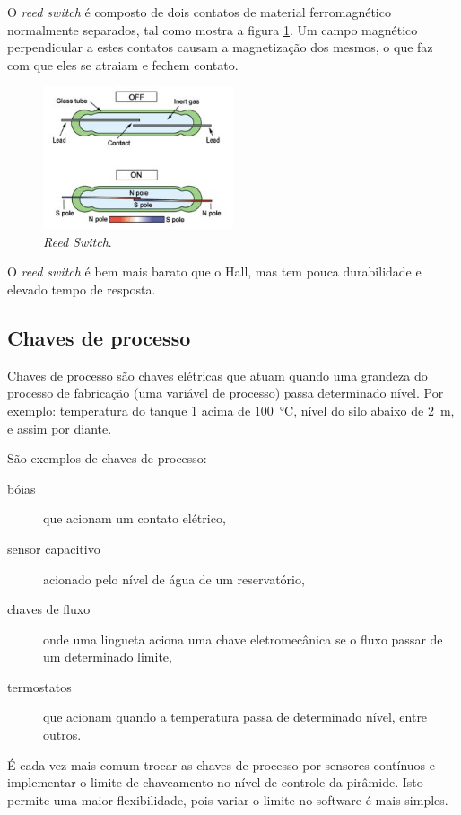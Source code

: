 O \emph{reed switch} é composto de dois contatos de material ferromagnético normalmente separados, tal como mostra a figura \ref{fig:reed}. Um campo magnético perpendicular a estes contatos causam a magnetização dos mesmos, o que faz com que eles se atraiam e fechem contato.

\begin{figure}
  \centering
  \includegraphics[width=0.5\textwidth]{figuras/reed}
  \caption{\emph{Reed Switch}.}\label{fig:reed}
\end{figure}

O \emph{reed switch} é bem mais barato que o Hall, mas tem pouca durabilidade e elevado tempo de resposta.

\subsection{Chaves de processo}

Chaves de processo são chaves elétricas que atuam quando uma grandeza do processo de fabricação (uma variável de processo) passa determinado nível. Por exemplo: temperatura do tanque 1 acima de \SI{100}{\celsius}, nível do silo abaixo de \SI{2}{\meter}, e assim por diante.

São exemplos de chaves de processo:
\begin{description}
  \item[bóias] que acionam um contato elétrico,
  \item[sensor capacitivo] acionado pelo nível de água de um reservatório,
  \item[chaves de fluxo] onde uma lingueta aciona uma chave eletromecânica se o fluxo passar de um  determinado limite,
  \item[termostatos] que acionam quando a temperatura passa de determinado nível, entre outros.
\end{description}

É cada vez mais comum trocar as chaves de processo por sensores contínuos e implementar o limite de chaveamento no nível de controle da pirâmide. Isto permite uma maior flexibilidade, pois variar o limite no software é mais simples.

